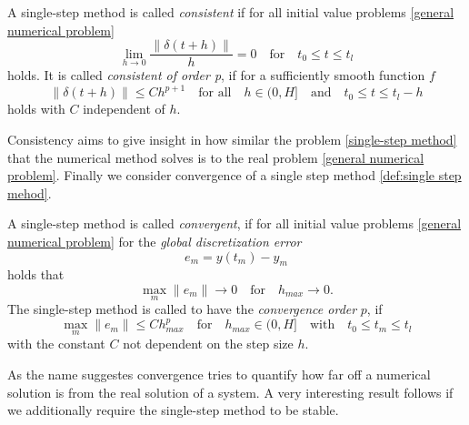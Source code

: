 	\begin{definition}\label{Consistency_SingleStep}
		A single-step method is called \emph{consistent} if for all initial value problems \eqref{general numerical problem} 
		\begin{equation}
			\lim\limits_{h \to 0} \frac{\|\delta(t+h)\|}{h} = 0 \quad \text{for} \quad t_0 \leq t \leq t_l
		\end{equation}
		holds.\newline
		It is called \emph{consistent of order p}, if for a sufficiently smooth function $f$
		\begin{equation}
			\|\delta(t+h)\| \leq Ch^{p+1} \quad \text{for all} \quad h \in \mathopen{(} 0,H \mathclose{]} \quad \text{and} \quad t_0 \leq t \leq t_l - h
		\end{equation}
		holds with $C$ independent of $h$.
	\end{definition}

	Consistency aims to give insight in how similar the problem \eqref{single-step method} that the numerical method solves is to the real problem \eqref{general numerical problem}. Finally we consider convergence of a single step method \ref{def:single step mehod}.

	\begin{definition}\label{Convergence_SingleStep}
		A single-step method is called \emph{convergent}, if for all initial value problems \eqref{general numerical problem} for the \emph{global discretization error}
		\begin{displaymath}
			e_m = y(t_m)-y_m
		\end{displaymath}
		holds that
		\begin{displaymath}
			\max\limits_{m}\|e_m\| \to 0 \quad \text{for} \quad h_{max} \to 0.
		\end{displaymath}
		The single-step method is called to have the \emph{convergence order} $p$, if
		\begin{displaymath}
			\max\limits_{m} \|e_m\| \leq C h_{max}^p \quad \text{for} \quad h_{max} \in \mathopen{(} 0,H \mathclose{]} \quad \text{with} \quad t_0 \leq t_m \leq t_l
		\end{displaymath}
		with the constant $C$ not dependent on the step size $h$.
	\end{definition}

	As the name suggestes convergence tries to quantify how far off a numerical solution is from the real solution of a system. A very interesting result follows if we additionally require the single-step method to be stable.
	

